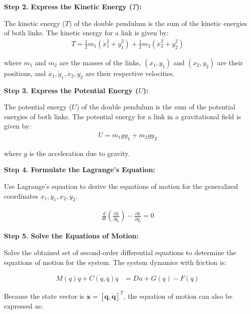 \textbf{Step 2. Express the Kinetic Energy (\(T\)):}

   The kinetic energy (\(T\)) of the double pendulum is the sum of the kinetic energies of both links. The kinetic energy for a link is given by:
   \begin{align}
        \label{eq:kinetic energy}
        T = \frac{1}{2} m_1 (\dot{x}_1^2 + \dot{y}_1^2) + \frac{1}{2} m_2 (\dot{x}_2^2 + \dot{y}_2^2)
   \end{align}

   where \(m_1\) and \(m_2\) are the masses of the links, \((x_1, y_1)\) and \((x_2, y_2)\) are their positions, and \(\dot{x}_1, \dot{y}_1, \dot{x}_2, \dot{y}_2\) are their respective velocities.

\textbf{Step 3. Express the Potential Energy (\(U\)):}

   The potential energy (\(U\)) of the double pendulum is the sum of the potential energies of both links. The potential energy for a link in a gravitational field is given by:
   \begin{align}
         \label{eq:potential energy}
         U = m_1 g y_1 + m_2 g y_2
   \end{align}

   where \(g\) is the acceleration due to gravity.
   
   
\textbf{Step 4. Formulate the Lagrange's Equation:}

   Use Lagrange's equation to derive the equations of motion for the generalized coordinates \(x_1, y_1, x_2, y_2\).

    \begin{align}
    \label{eq:lagrange equation}
    \frac{d}{dt} \left(\frac{\partial L}{\partial \dot{q_i}}\right) - \frac{\partial L}{\partial q_i} = 0
    \end{align}

\textbf{Step 5. Solve the Equations of Motion:}

   Solve the obtained set of second-order differential equations to determine the equations of motion for the system. The system dynamics with friction is:
   
   \begin{align}
        \label{eq:EoM}
        M(q)\ddot{q} + C(q,\dot{q})\dot{q} &= Du + G(q) - F(\dot{q})
   \end{align}
    
    Because the state vector is \(\mathbf{x}=[\mathbf{q},\mathbf{\dot{q}}]^T\), the equation of motion can also be expressed as:
    
